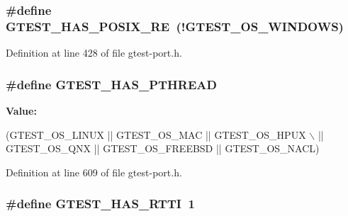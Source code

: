 \subsubsection[{\texorpdfstring{G\+T\+E\+S\+T\+\_\+\+H\+A\+S\+\_\+\+P\+O\+S\+I\+X\+\_\+\+RE}{GTEST_HAS_POSIX_RE}}]{\setlength{\rightskip}{0pt plus 5cm}\#define G\+T\+E\+S\+T\+\_\+\+H\+A\+S\+\_\+\+P\+O\+S\+I\+X\+\_\+\+RE~(!G\+T\+E\+S\+T\+\_\+\+O\+S\+\_\+\+W\+I\+N\+D\+O\+WS)}\hypertarget{gtest-port_8h_af5c4295ea1d76f07f65934f659792431}{}\label{gtest-port_8h_af5c4295ea1d76f07f65934f659792431}


Definition at line 428 of file gtest-\/port.\+h.

\subsubsection[{\texorpdfstring{G\+T\+E\+S\+T\+\_\+\+H\+A\+S\+\_\+\+P\+T\+H\+R\+E\+AD}{GTEST_HAS_PTHREAD}}]{\setlength{\rightskip}{0pt plus 5cm}\#define G\+T\+E\+S\+T\+\_\+\+H\+A\+S\+\_\+\+P\+T\+H\+R\+E\+AD}\hypertarget{gtest-port_8h_a3341397e1952de0b9cd88762d4d3ae4b}{}\label{gtest-port_8h_a3341397e1952de0b9cd88762d4d3ae4b}
{\bfseries Value\+:}
\begin{DoxyCode}
(GTEST\_OS\_LINUX || GTEST\_OS\_MAC || GTEST\_OS\_HPUX \(\backslash\)
    || GTEST\_OS\_QNX || GTEST\_OS\_FREEBSD || GTEST\_OS\_NACL)
\end{DoxyCode}


Definition at line 609 of file gtest-\/port.\+h.

\subsubsection[{\texorpdfstring{G\+T\+E\+S\+T\+\_\+\+H\+A\+S\+\_\+\+R\+T\+TI}{GTEST_HAS_RTTI}}]{\setlength{\rightskip}{0pt plus 5cm}\#define G\+T\+E\+S\+T\+\_\+\+H\+A\+S\+\_\+\+R\+T\+TI~1}\hypertarget{gtest-port_8h_a9ba781217167f905bff2f1c410a97930}{}\label{gtest-port_8h_a9ba781217167f905bff2f1c410a97930}


